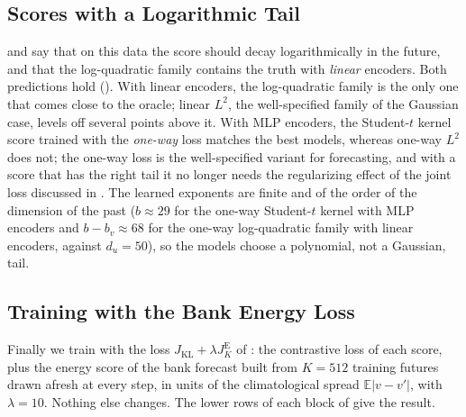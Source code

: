 \documentclass[11pt]{article}
\theoremstyle{plain}
\theoremstyle{definition}
\theoremstyle{remark}
\newcommand{\E}{\mathbb{E}}
\newcommand{\abs}[1]{\left\lvert #1 \right\rvert}
\begin{document}
\subsection{Scores with a Logarithmic Tail}
\label{ssec:logtail}

 and  say that on this data the
score should decay logarithmically in the future, and that the log-quadratic
family contains the truth with \emph{linear} encoders. Both predictions hold
(). With linear encoders, the log-quadratic family is
the only one that comes close to the oracle; linear $L^2$, the well-specified
family of the Gaussian case, levels off several points above it. With MLP
encoders, the Student-$t$ kernel score trained with the \emph{one-way} loss
matches the best models, whereas one-way $L^2$ does not; the one-way loss is
the well-specified variant for forecasting, and with a score that has the
right tail it no longer needs the regularizing effect of the joint loss
discussed in . The learned exponents are finite and of the
order of the dimension of the past
($b\approx29$ for the one-way Student-$t$ kernel with MLP encoders and $b-b_v\approx68$ for the one-way log-quadratic family with linear encoders, against $d_u=50$),
so the models choose a polynomial, not a Gaussian, tail.

\subsection{Training with the Bank Energy Loss}
\label{ssec:energytraining}

Finally we train with the loss $J_{\mathrm{KL}}+\lambda J^{\mathrm{E}}_{K}$ of
: the contrastive loss of each score, plus the energy
score of the bank forecast built from $K=512$ training futures drawn afresh
at every step, in units of the climatological spread
$\E\abs{v-v'}$, with $\lambda=10$. Nothing else changes. The lower rows of
each block of  give the result.
\end{document}
